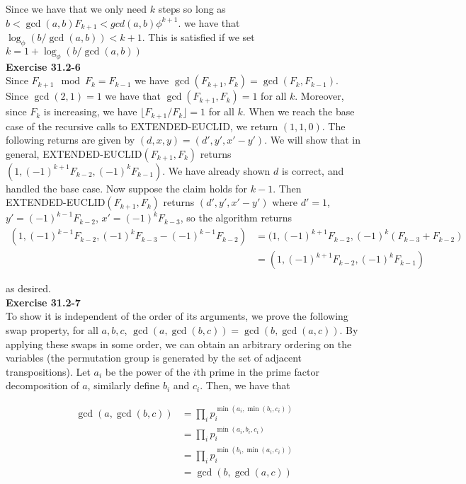 \documentclass{article}
\begin{document}
Since we have that we only need $k$ steps so long as $b <\gcd(a,b) F_{k+1} < gcd(a,b) \phi^{k+1}$. we have that $\log_\phi (b/\gcd(a,b)) < k+1$. This is satisfied if we set $k=1 + \log_\phi(b/\gcd(a,b))$\\

\noindent\textbf{Exercise 31.2-6}\\

Since $F_{k+1} \mod F_{k} = F_{k-1}$ we have $\gcd(F_{k+1},F_k) = \gcd(F_k,F_{k-1})$.  Since $\gcd(2,1) = 1$ we have that $\gcd(F_{k+1},F_k) = 1$ for all $k$.  Moreover, since $F_k$ is increasing, we have $\lfloor F_{k+1} / F_k \rfloor = 1$ for all $k$. When we reach the base case of the recursive calls to EXTENDED-EUCLID, we return $(1,1,0)$. The following returns are given by $(d,x,y) = (d',y',x'-y')$.  We will show that in general, EXTENDED-EUCLID$(F_{k+1},F_k)$ returns $(1, (-1)^{k+1}F_{k-2}, (-1)^kF_{k-1})$. We have already shown $d$ is correct, and handled the base case.  Now suppose the claim holds for $k-1$.  Then EXTENDED-EUCLID$(F_{k+1}, F_{k})$ returns $(d',y',x'-y')$ where $d' = 1$, $y' = (-1)^{k-1}F_{k-2}$, $x' = (-1)^{k}F_{k-3}$, so the algorithm returns 
\begin{align*}
(1,  (-1)^{k-1}F_{k-2}, (-1)^{k}F_{k-3} -  (-1)^{k-1}F_{k-2}) &= (1, (-1)^{k+1} F_{k-2}, (-1)^k(F_{k-3} + F_{k-2}) \\
&=  (1, (-1)^{k+1} F_{k-2}, (-1)^kF_{k-1})
\end{align*}

as desired. \\

\noindent\textbf{Exercise 31.2-7}\\

To show it is independent of the order of its arguments, we prove the following swap property, for all $a,b,c$, $\gcd(a,\gcd(b,c)) = \gcd(b,\gcd(a,c))$. By applying these swaps in some order, we can obtain an arbitrary ordering on the variables (the permutation group is generated by the set of adjacent transpositions). Let $a_i$ be the power of the $i$th prime in the prime factor decomposition of $a$, similarly define $b_i$ and $c_i$. Then, we have that 

\begin{align*}
\gcd(a,\gcd(b,c)) &= \prod_{i}p_i^{\min(a_i,\min(b_i,c_i))}\\
& = \prod_{i}p_i^{\min(a_i,b_i,c_i)} \\
&= \prod_{i}p_i^{\min(b_i,\min(a_i,c_i))} \\
&= \gcd(b,\gcd(a,c)) 
\end{align*}
\end{document}
